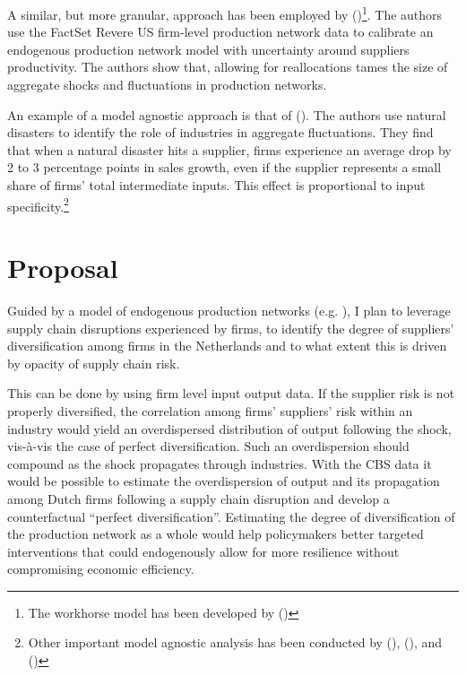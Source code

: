 \documentclass[american, abstract=on]{scrartcl}
\newcommand{\citein}[1]{\citeauthor{#1} (\citeyear{#1})}
\begin{document}
A similar, but more granular, approach has been employed by \citein{mathieu_taschereau-dumouchel_cascades_2020}\footnote{The workhorse model has been developed by \citein{acemoglu_endogenous_2020}}. The authors use the FactSet Revere US firm-level production network data to calibrate an endogenous production network model with uncertainty around suppliers productivity. The authors show that, allowing for reallocations tames the size of aggregate shocks and fluctuations in production networks. 

An example of a model agnostic approach is that of \citein{barrot_input_2016}. The authors use natural disasters to identify the role of industries in aggregate fluctuations. They find that when a natural disaster hits a supplier, firms experience an average drop by 2 to 3 percentage points in sales growth, even if the supplier represents a small share of firms' total intermediate inputs. This effect is proportional to input specificity.\footnote{Other important model agnostic analysis has been conducted by \citein{luttmer_selection_2007}, \citein{atalay_network_2011}, and \citein{mackay_how_2020}}

\section{Proposal}

Guided by a model of endogenous production networks (e.g. \cite{kopytov_endogenous_2021,elliott_supply_2022}), I plan to leverage supply chain disruptions experienced by firms, to identify the degree of suppliers' diversification among firms in the Netherlands and to what extent this is driven by opacity of supply chain risk. 

This can be done by using firm level input output data. If the supplier risk is not properly diversified, the correlation among firms' suppliers' risk within an industry would yield an overdispersed distribution of output following the shock, vis-à-vis the case of perfect diversification. Such an overdispersion should compound as the shock propagates through industries. With the CBS data it would be possible to estimate the overdispersion of output and its propagation among Dutch firms following a supply chain disruption and develop a counterfactual ``perfect diversification''. Estimating the degree of diversification of the production network as a whole would help policymakers better targeted interventions that could endogenously allow for more resilience without compromising economic efficiency.
\end{document}
